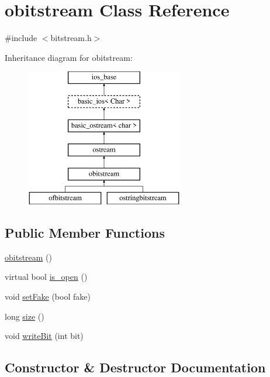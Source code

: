 \hypertarget{classobitstream}{}\section{obitstream Class Reference}
\label{classobitstream}


{\ttfamily \#include $<$bitstream.\+h$>$}

Inheritance diagram for obitstream\+:\begin{figure}[H]
\begin{center}
\leavevmode
\includegraphics[height=6.000000cm]{classobitstream}
\end{center}
\end{figure}
\subsection*{Public Member Functions}
\begin{DoxyCompactItemize}
\item 
\mbox{\hyperlink{classobitstream_affc1b0bda48ee1c09b796e92ad7f8954}{obitstream}} ()
\item 
virtual bool \mbox{\hyperlink{classobitstream_a2f57f54d8c03b615bb31eee091d8a88a}{is\+\_\+open}} ()
\item 
void \mbox{\hyperlink{classobitstream_ad916b4624eb09d375514964f867b475c}{set\+Fake}} (bool fake)
\item 
long \mbox{\hyperlink{classobitstream_a22727e9c338fb1aaa6722031445373c3}{size}} ()
\item 
void \mbox{\hyperlink{classobitstream_a487c88ba2560a4657d18c3edb7d9d247}{write\+Bit}} (int bit)
\end{DoxyCompactItemize}


\subsection{Constructor \& Destructor Documentation}
\mbox{\label{classobitstream_affc1b0bda48ee1c09b796e92ad7f8954}} 
